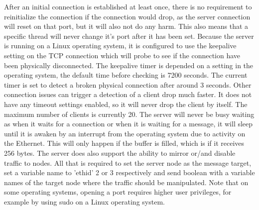 After an initial connection is established at least once, there is no requirement to reinitialize the connection if the connection would drop, as the server connection will reset on that port, but it will also not do any harm. This also means that a specific thread will never change it's port after it has been set. Because the server is running on a Linux operating system, it is configured to use the keepalive setting on the TCP connection which will probe to see if the connection have been physically disconnected. The keepalive timer is depended on a setting in the operating system, the default time before checking is 7200 seconds. The current timer is set to detect a broken physical connection after around 3 seconds. Other connection issues can trigger a detection of a client drop much faster. It does not have any timeout settings enabled, so it will never drop the client by itself. The maximum number of clients is currently 20. The server will never be busy waiting as when it waits for a connection or when it is waiting for a message, it will sleep until it is awaken by an interrupt from the operating system due to activity on the Ethernet. This will only happen if the buffer is filled, which is if it receives 256 bytes. The server does also support the ability to mirror or/and disable traffic to nodes. All that is required to set the server node as the message target, set a variable name to 'ethid' 2 or 3 respectively and send boolean with a variable names of the target node where the traffic should be manipulated. Note that on some operating systems, opening a port requires higher user privileges, for example by using sudo on a Linux operating system.

